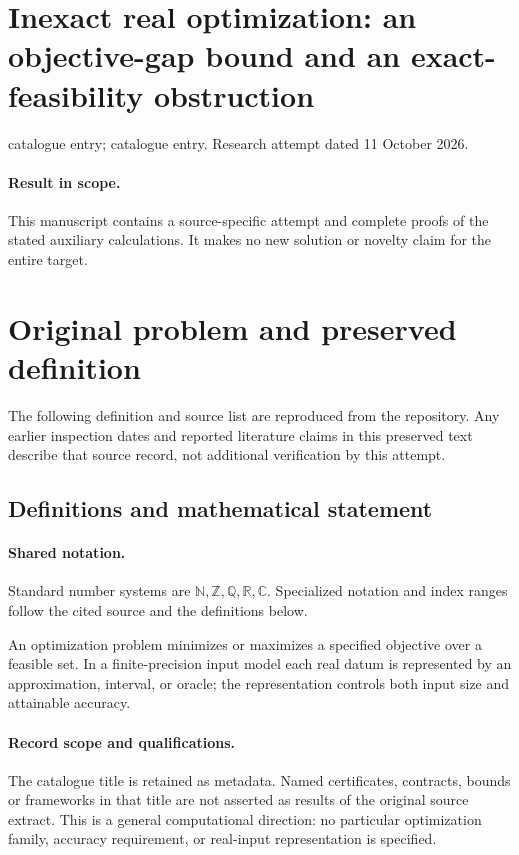 \documentclass[11pt]{article}
\begin{document}
\section*{Inexact real optimization: an objective-gap bound and an exact-feasibility obstruction}
\noindent catalogue entry; catalogue entry. Research attempt dated 11 October 2026.
\paragraph{Result in scope.}This manuscript contains a source-specific attempt and complete proofs of the stated auxiliary calculations. It makes no new solution or novelty claim for the entire target.
\section{Original problem and preserved definition}
The following definition and source list are reproduced from the repository. Any earlier inspection dates and reported literature claims in this preserved text describe that source record, not additional verification by this attempt.
\subsection{Definitions and mathematical statement}

\paragraph{Shared notation.}Standard number systems are $\mathbb N,\mathbb Z,\mathbb Q,\mathbb R,\mathbb C$. Specialized notation and index ranges follow the cited source and the definitions below.


An optimization problem minimizes or maximizes a specified objective over a feasible set. In a finite-precision input model each real datum is represented by an approximation, interval, or oracle; the representation controls both input size and attainable accuracy.
\paragraph{Record scope and qualifications.}
The catalogue title is retained as metadata. Named certificates, contracts, bounds or frameworks in that title are not asserted as results of the original source extract.
This is a general computational direction: no particular optimization family, accuracy requirement, or real-input representation is specified.
\end{document}
